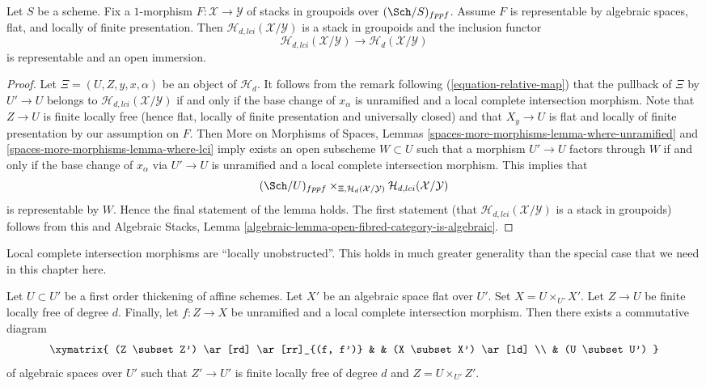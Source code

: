 \begin{lemma}
\label{lemma-lci-locus-stack-in-groupoids}
Let $S$ be a scheme. Fix a $1$-morphism
$F : \mathcal{X} \longrightarrow \mathcal{Y}$
of stacks in groupoids over $(\Sch/S)_{fppf}$.
Assume $F$ is representable by algebraic spaces, flat, and locally
of finite presentation. Then $\mathcal{H}_{d, lci}(\mathcal{X}/\mathcal{Y})$
is a stack in groupoids and the inclusion functor
$$
\mathcal{H}_{d, lci}(\mathcal{X}/\mathcal{Y})
\longrightarrow
\mathcal{H}_d(\mathcal{X}/\mathcal{Y})
$$
is representable and an open immersion.
\end{lemma}

\begin{proof}
Let $\Xi = (U, Z, y, x, \alpha)$ be an object of $\mathcal{H}_d$. It follows
from the remark following
(\ref{equation-relative-map})
that the pullback of $\Xi$ by $U' \to U$ belongs to
$\mathcal{H}_{d, lci}(\mathcal{X}/\mathcal{Y})$ if and only if the base
change of $x_\alpha$ is unramified and a local complete intersection morphism.
Note that $Z \to U$ is finite locally free (hence flat, locally of
finite presentation and universally closed) and that $X_y \to U$ is
flat and locally of finite presentation by our assumption on $F$. Then
More on Morphisms of Spaces, Lemmas
\ref{spaces-more-morphisms-lemma-where-unramified} and
\ref{spaces-more-morphisms-lemma-where-lci}
imply exists an open subscheme $W \subset U$ such that a morphism
$U' \to U$ factors through $W$ if and only if the base change of
$x_\alpha$ via $U' \to U$ is unramified and a local complete intersection
morphism. This implies that
$$
(\Sch/U)_{fppf}
\times_{\Xi, \mathcal{H}_d(\mathcal{X}/\mathcal{Y})}
\mathcal{H}_{d, lci}(\mathcal{X}/\mathcal{Y})
$$
is representable by $W$. Hence the final statement of the lemma
holds. The first statement (that
$\mathcal{H}_{d, lci}(\mathcal{X}/\mathcal{Y})$ is a stack in groupoids)
follows from this and
Algebraic Stacks,
Lemma \ref{algebraic-lemma-open-fibred-category-is-algebraic}.
\end{proof}

\noindent
Local complete intersection morphisms are ``locally unobstructed''.
This holds in much greater generality than the special case
that we need in this chapter here.

\begin{lemma}
\label{lemma-lci-unobstructed}
Let $U \subset U'$ be a first order thickening of affine schemes.
Let $X'$ be an algebraic space flat over $U'$. Set $X = U \times_{U'} X'$.
Let $Z \to U$ be finite locally free of degree $d$. Finally, let
$f : Z \to X$ be unramified and a local complete intersection morphism.
Then there exists a commutative diagram
$$
\xymatrix{
(Z \subset Z') \ar[rd] \ar[rr]_{(f, f')} & & (X \subset X') \ar[ld] \\
& (U \subset U')
}
$$
of algebraic spaces over $U'$ such that $Z' \to U'$ is finite locally free
of degree $d$ and $Z = U \times_{U'} Z'$.
\end{lemma}

